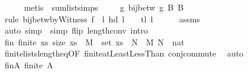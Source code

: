 \begin{isabellebody}
\ \ \ \ \isamarkupfalse%
\ {\isacharparenleft}{\kern0pt}metis\ {}\ sum{\isacharunderscore}{\kern0pt}list{\isacharunderscore}{\kern0pt}simps{\isacharparenleft}{\kern0pt}{}{\isacharparenright}{\kern0pt}\ {}{\isacharparenright}{\kern0pt}\isanewline
\ \ \isamarkupfalse%
\ g{\isacharcolon}{\kern0pt}\ {\isachardoublequoteopen}bij{\isacharunderscore}{\kern0pt}betw\ {\isacharquery}{\kern0pt}g\ {\isacharquery}{\kern0pt}B\ {\isacharquery}{\kern0pt}B{\isacharprime}{\kern0pt}{\isachardoublequoteclose}\isanewline
\ \ \ \ \isamarkupfalse%
\ {\isacharparenleft}{\kern0pt}rule\ bij{\isacharunderscore}{\kern0pt}betw{\isacharunderscore}{\kern0pt}byWitness{\isacharbrackleft}{\kern0pt}\ f{\isacharprime}{\kern0pt}\ {\isacharequal}{\kern0pt}\ {\isachardoublequoteopen}{\isasymlambda}l{\isachardot}{\kern0pt}\ {\isacharparenleft}{\kern0pt}hd\ l\ {\isacharminus}{\kern0pt}\ {}{\isacharparenright}{\kern0pt}\ {\isacharhash}{\kern0pt}\ tl\ l{\isachardoublequoteclose}{\isacharbrackright}{\kern0pt}{\isacharparenright}{\kern0pt}\isanewline
\ \ \ \ \isamarkupfalse%
\ assms\isanewline
\ \ \ \ \isamarkupfalse%
\ {\isacharparenleft}{\kern0pt}auto\ simp{\isacharcolon}{\kern0pt}\ {}\ simp\ flip{\isacharcolon}{\kern0pt}\ length{\isacharunderscore}{\kern0pt}{}{\isacharunderscore}{\kern0pt}conv\ intro{\isacharbang}{\kern0pt}{\isacharcolon}{\kern0pt}\ {}{\isacharparenright}{\kern0pt}\isanewline
\ \ \isamarkupfalse%
\ fin{\isacharcolon}{\kern0pt}\ {\isachardoublequoteopen}finite\ {\isacharbraceleft}{\kern0pt}xs{\isachardot}{\kern0pt}\ size\ xs\ {\isacharequal}{\kern0pt}\ M\ {\isasymand}\ set\ xs\ {\isasymsubseteq}\ {\isacharbraceleft}{\kern0pt}{}{\isachardot}{\kern0pt}{\isachardot}{\kern0pt}{\isacharless}{\kern0pt}N{\isacharbraceright}{\kern0pt}{\isacharbraceright}{\kern0pt}{\isachardoublequoteclose}\ \ M\ N\ {\isacharcolon}{\kern0pt}{\isacharcolon}{\kern0pt}\ nat\isanewline
\ \ \ \ \isamarkupfalse%
\ finite{\isacharunderscore}{\kern0pt}lists{\isacharunderscore}{\kern0pt}length{\isacharunderscore}{\kern0pt}eq{\isacharbrackleft}{\kern0pt}OF\ finite{\isacharunderscore}{\kern0pt}atLeastLessThan{\isacharbrackright}{\kern0pt}\ conj{\isacharunderscore}{\kern0pt}commute\ \isamarkupfalse%
\ auto\isanewline
\ \ \isamarkupfalse%
\ fin{\isacharunderscore}{\kern0pt}A{\isacharcolon}{\kern0pt}\ {\isachardoublequoteopen}finite\ {\isacharquery}{\kern0pt}A{\isachardoublequoteclose}\ \isamarkupfalse%

\end{isabellebody}
